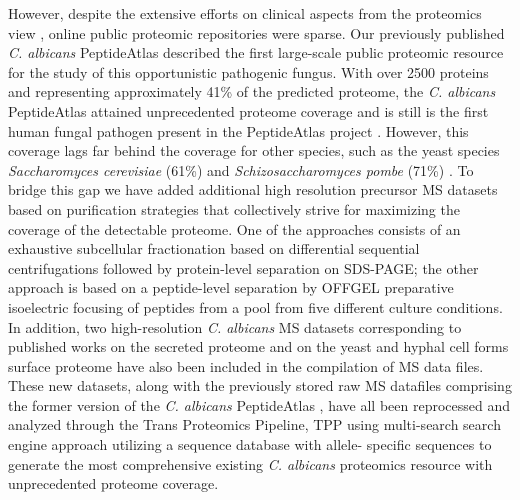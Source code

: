 However, despite the extensive efforts on clinical
aspects from the proteomics view \citep{Pitarch2006,Cabezon2009,Pitarch2009,Rupp2004},
online public proteomic repositories were sparse.
Our previously published \textit{C. albicans} PeptideAtlas \citep{Vialas2013} described the first large-scale public
proteomic resource for the study of this opportunistic pathogenic fungus. With over 2500
proteins and representing approximately 41\% of the predicted proteome, the \textit{C. albicans}
PeptideAtlas attained unprecedented proteome coverage and is still is the first human fungal
pathogen present in the PeptideAtlas project \citep{Desiere2006,Deutsch2015}. 
However, this coverage lags far behind
the coverage for other species, such as the yeast species \textit{Saccharomyces cerevisiae} (61\%)
\citep{King2006} and \textit{Schizosaccharomyces pombe} (71\%) \citep{Gunaratne2013b}. 
To bridge this gap we have added
additional high resolution precursor MS datasets based on purification strategies that
collectively strive for maximizing the coverage of the detectable proteome. One of the
approaches consists of an exhaustive subcellular fractionation based on differential
sequential centrifugations followed by protein-level separation on SDS-PAGE; the other
approach is based on a peptide-level separation by OFFGEL preparative isoelectric focusing
of peptides \citep{Ros2002,Horth2006} from a pool from five different culture conditions. 
In addition, two high-resolution \textit{C. albicans} MS datasets corresponding to published works on the secreted
proteome \citep{Gil-Bona2015a} and on the yeast and hyphal cell forms surface proteome \citep{Gil-Bona2015} have also been
included in the compilation of MS data files. These new datasets, along with the previously
stored raw MS datafiles comprising the former version of the \textit{C. albicans} PeptideAtlas \citep{Vialas2013},
have all been reprocessed and analyzed through the Trans Proteomics Pipeline, TPP \citep{Keller2005, Deutsch2015}
 using multi-search search engine approach utilizing a sequence database with allele-
specific sequences to generate the most comprehensive existing \textit{C. albicans} proteomics
resource with unprecedented proteome coverage.

